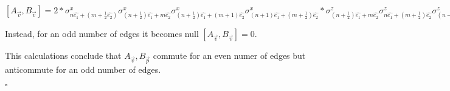 \documentclass[12pt]{report}
\begin{document}
\begin{minipage}{1\textwidth}
		\begin{center}
			
			$[A_{\vec{v}},B_{\vec{v}}] = 2 *
			\sigma^x_{n\hat{e_1} + (m+\frac{1}{2}\hat{e_2})} \sigma^x_{(n+ \frac{1}{2})\hat{e_1} + m\hat{e_2}} \sigma^x_{(n+ \frac{1}{2})\hat{e_1} + (m + 1)\hat{e_2}} \sigma^x_{(n+ 1)\hat{e_1} + (m + \frac{1}{2})\hat{e_2}}*
			\sigma^z_{(n+\frac{1}{2})\hat{e_1} + m\hat{e_2}} \sigma^z_{n\hat{e_1}+(m+\frac{1}{2})\hat{e_2}} \sigma^z_{(n-\frac{1}{2})\hat{e_1} + m\hat{e_2}} \sigma^z_{n\hat{e_1}+(m-\frac{1}{2})\hat{e_2}} $ 	\newline 
			
			
		\end{center}
		Instead, for an odd number of edges it becomes null $[A_{\vec{v}},B_{\vec{v}}]=0$.\newline
		
		This calculations conclude that $A_{\vec{v}},B_{\vec{p}}$ commute for an even numer of edges but anticommute for an odd number of edges.\newline
		
		\hfill $\square$\newline
		
		
	\end{minipage}
	
\end{document}
